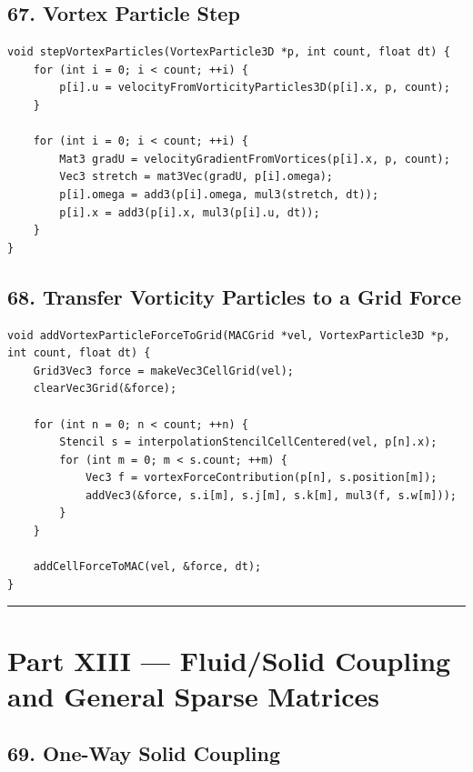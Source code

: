 \documentclass[10pt,letterpaper]{article}
\begin{document}
\subsection*{67. Vortex Particle Step}

\begin{verbatim}
void stepVortexParticles(VortexParticle3D *p, int count, float dt) {
    for (int i = 0; i < count; ++i) {
        p[i].u = velocityFromVorticityParticles3D(p[i].x, p, count);
    }

    for (int i = 0; i < count; ++i) {
        Mat3 gradU = velocityGradientFromVortices(p[i].x, p, count);
        Vec3 stretch = mat3Vec(gradU, p[i].omega);
        p[i].omega = add3(p[i].omega, mul3(stretch, dt));
        p[i].x = add3(p[i].x, mul3(p[i].u, dt));
    }
}
\end{verbatim}

\subsection*{68. Transfer Vorticity Particles to a Grid Force}

\begin{verbatim}
void addVortexParticleForceToGrid(MACGrid *vel, VortexParticle3D *p, int count, float dt) {
    Grid3Vec3 force = makeVec3CellGrid(vel);
    clearVec3Grid(&force);

    for (int n = 0; n < count; ++n) {
        Stencil s = interpolationStencilCellCentered(vel, p[n].x);
        for (int m = 0; m < s.count; ++m) {
            Vec3 f = vortexForceContribution(p[n], s.position[m]);
            addVec3(&force, s.i[m], s.j[m], s.k[m], mul3(f, s.w[m]));
        }
    }

    addCellForceToMAC(vel, &force, dt);
}
\end{verbatim}

\medskip\hrule\medskip

\clearpage
{}
\section*{Part XIII --- Fluid/Solid Coupling and General Sparse Matrices}

\subsection*{69. One-Way Solid Coupling}
\end{document}
